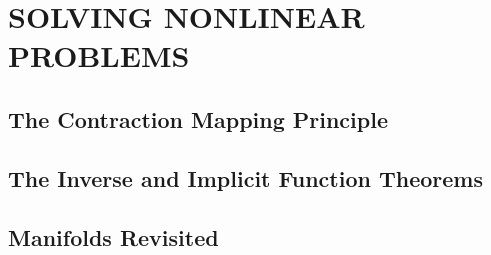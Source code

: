 \section{SOLVING NONLINEAR PROBLEMS}
\subsection{The Contraction Mapping Principle}
\subsection{The Inverse and Implicit Function Theorems}
\subsection{Manifolds Revisited}
